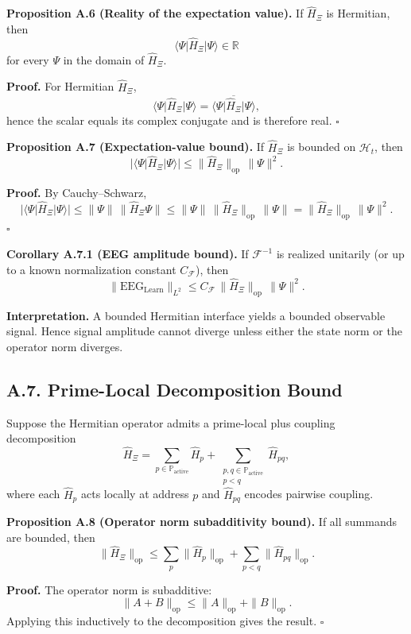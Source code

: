 \documentclass[11pt]{article}
\begin{document}
\textbf{Proposition A.6 (Reality of the expectation value).}
If $\hat{H}_\Xi$ is Hermitian, then
\[
\langle \Psi \vert \hat{H}_\Xi \vert \Psi \rangle \in \mathbb{R}
\]
for every $\Psi$ in the domain of $\hat{H}_\Xi$.

\textbf{Proof.}
For Hermitian $\hat{H}_\Xi$,
\[
\langle \Psi \vert \hat{H}_\Xi \vert \Psi \rangle
=
\overline{\langle \Psi \vert \hat{H}_\Xi \vert \Psi \rangle},
\]
hence the scalar equals its complex conjugate and is therefore real. \cite{HermitianOps,HermiticityNotes} \hfill $\square$

\textbf{Proposition A.7 (Expectation-value bound).}
If $\hat{H}_\Xi$ is bounded on $\mathcal{H}_t$, then
\[
\big|\langle \Psi \vert \hat{H}_\Xi \vert \Psi \rangle\big|
\le
\|\hat{H}_\Xi\|_{\mathrm{op}} \,\|\Psi\|^2.
\]

\textbf{Proof.}
By Cauchy--Schwarz,
\[
\big|\langle \Psi \vert \hat{H}_\Xi \vert \Psi \rangle\big|
\le
\|\Psi\|\,\|\hat{H}_\Xi \Psi\|
\le
\|\Psi\|\,\|\hat{H}_\Xi\|_{\mathrm{op}}\,\|\Psi\|
=
\|\hat{H}_\Xi\|_{\mathrm{op}}\,\|\Psi\|^2.
\]
\hfill $\square$

\textbf{Corollary A.7.1 (EEG amplitude bound).}
If $\mathcal{F}^{-1}$ is realized unitarily (or up to a known normalization constant $C_{\mathcal{F}}$), then
\[
\|\mathrm{EEG}_{\mathrm{Learn}}\|_{L^2}
\le
C_{\mathcal{F}}\,\|\hat{H}_\Xi\|_{\mathrm{op}}\,\|\Psi\|^2.
\]

\textbf{Interpretation.}
A bounded Hermitian interface yields a bounded observable signal. Hence signal amplitude cannot diverge unless either the state norm or the operator norm diverges.

\subsection*{A.7. Prime-Local Decomposition Bound}

Suppose the Hermitian operator admits a prime-local plus coupling decomposition
\[
\hat{H}_\Xi
=
\sum_{p\in\mathbb{P}_{\mathrm{active}}} \hat{H}_p
+
\sum_{\substack{p,q\in\mathbb{P}_{\mathrm{active}}\\ p<q}} \hat{H}_{pq},
\]
where each $\hat{H}_p$ acts locally at address $p$ and $\hat{H}_{pq}$ encodes pairwise coupling.

\textbf{Proposition A.8 (Operator norm subadditivity bound).}
If all summands are bounded, then
\[
\|\hat{H}_\Xi\|_{\mathrm{op}}
\le
\sum_p \|\hat{H}_p\|_{\mathrm{op}}
+
\sum_{p<q} \|\hat{H}_{pq}\|_{\mathrm{op}}.
\]

\textbf{Proof.}
The operator norm is subadditive:
\[
\|A+B\|_{\mathrm{op}} \le \|A\|_{\mathrm{op}} + \|B\|_{\mathrm{op}}.
\]
Applying this inductively to the decomposition gives the result. \hfill $\square$
\end{document}
